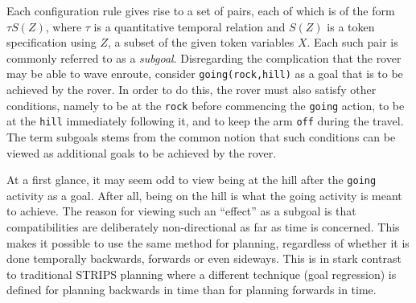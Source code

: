 Each configuration rule gives rise to a set of pairs, each of which is
of the form $\tau S(Z)$, where $\tau$ is a quantitative temporal
relation and $S(Z)$ is a token specification using $Z$, a subset of
the given token variables $X$.  Each such pair is commonly referred to
as a {\em subgoal}.  Disregarding the complication that the rover may
be able to wave enroute, consider {\tt going(rock,hill)} as a goal
that is to be achieved by the rover.  In order to do this, the rover
must also satisfy other conditions, namely to be at the {\tt rock}
before commencing the {\tt going} action, to be at the {\tt hill}
immediately following it, and to keep the arm {\tt off} during the
travel.  The term subgoals stems from the common notion that such
conditions can be viewed as additional goals to be achieved by the
rover.

At a first glance, it may seem odd to view being at the hill after the
{\tt going} activity as a goal.  After all, being on the hill is what
the going activity is meant to achieve.  The reason for viewing such
an ``effect'' as a subgoal is that compatibilities are deliberately
non-directional as far as time is concerned.  This makes it possible
to use the same method for planning, regardless of whether it is done
temporally backwards, forwards or even sideways.  This is in stark
contrast to traditional STRIPS planning where a different technique
(goal regression) is defined for planning backwards in time than for
planning forwards in time.







